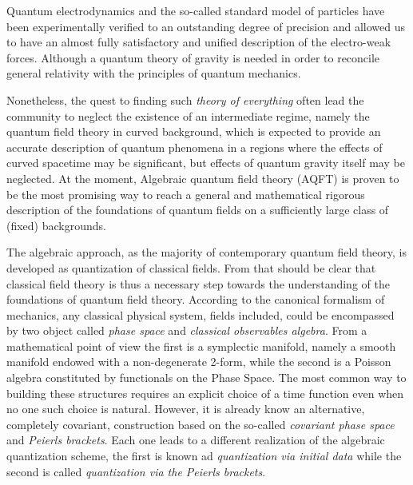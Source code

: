 \documentclass[Main]{subfiles}
\begin{document}
Quantum electrodynamics and the so-called standard model of particles have been experimentally verified to an outstanding degree of precision and allowed us to have an almost fully satisfactory and unified description of the electro-weak forces. 
Although a quantum theory of gravity is needed in order to reconcile general relativity with the principles of quantum mechanics. 

Nonetheless, the quest to finding such \emph{theory of everything} often lead the community to neglect the existence of an intermediate regime, namely the quantum field theory in curved background, which is expected to provide an accurate description of quantum phenomena in a regions where the effects of curved spacetime may be significant, but effects of quantum gravity itself may be neglected. 
At the moment, Algebraic quantum field theory (AQFT) is proven to be the most promising way to reach a general and mathematical rigorous description of the foundations of quantum fields on a  sufficiently large class of (fixed) backgrounds.

The algebraic approach, as the majority of contemporary quantum field theory, is developed as quantization of classical fields.
From that should be clear that classical field theory  is thus a necessary step towards the understanding of the foundations of  quantum field theory.
	According to the canonical formalism of mechanics, any  classical physical system, fields included, could be encompassed by two object  called \emph{phase space} and \emph{classical observables algebra}. 
	From a mathematical point of view  the first is a symplectic manifold, namely a smooth manifold endowed with a non-degenerate 2-form, while the second is a Poisson algebra constituted by functionals on the Phase Space.
	The most common way to building these structures requires an explicit choice of a time function even when no one such choice is natural. 
	However, it is already know an alternative, completely covariant, construction based on the so-called \emph{covariant phase space} and \emph{Peierls brackets}.
	Each one leads to a different realization of the algebraic quantization scheme, the first is known ad \emph{quantization via initial data} while the second is called \emph{quantization via the Peierls brackets}.
	
\end{document}
